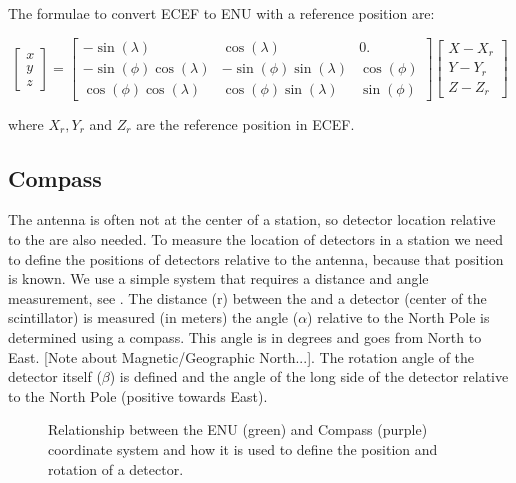 The formulae to convert ECEF to ENU with a reference position are:

\begin{equation}
    \begin{bmatrix}
    x \\ y \\ z
    \end{bmatrix}
    = 
    \begin{bmatrix}
                   -\sin(\lambda) &             \cos(\lambda) &         0. \\
        -\sin(\phi) \cos(\lambda) & -\sin(\phi) \sin(\lambda) & \cos(\phi) \\
         \cos(\phi) \cos(\lambda) &  \cos(\phi) \sin(\lambda) & \sin(\phi)
    \end{bmatrix}
    \begin{bmatrix}
    X - X_r \\ Y - Y_r \\ Z - Z_r
    \end{bmatrix}
\end{equation}

where $X_r, Y_r$ and $Z_r$ are the reference position in ECEF.


\subsection{Compass}

The \gps antenna is often not at the center of a station, so detector
location relative to the \gps are also needed. To measure the location
of detectors in a station we need to define the positions of detectors
relative to the \gps antenna, because that position is known. We use a
simple system that requires a distance and angle measurement, see
. The distance (r) between the \gps and a
detector (center of the scintillator) is measured (in meters) the angle
($\alpha$) relative to the North Pole is determined using a compass.
This angle is in degrees and goes from North to East. [Note about
Magnetic/Geographic North...]. The rotation angle of the detector itself
($\beta$) is defined and the angle of the long side of the detector
relative to the North Pole (positive towards East).

\begin{figure}
    \centering
    
    \caption{Relationship between the ENU (green) and Compass (purple)
             coordinate system and how it is used to define the position
             and rotation of a detector.}
    \label{fig:enu_compass}
\end{figure}

